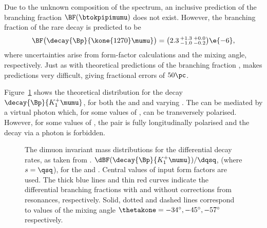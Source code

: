 Due to the unknown composition of the \mass{\kpipi} spectrum, an inclusive prediction of the
branching fraction $\BF(\btokpipimumu)$ does not exist.
However, the branching fraction of the rare decay  is predicted to
be~\cite{Hatanaka:2008gu}
\begin{equation}
  \BF\big(\decay{\Bp}{\kone{1270}\mumu}\big) = \big(2.3\,^{+1.3}_{-1.0}\,^{+0.0}_{-0.2}\big)\e{-6},
\end{equation}
where uncertainties arise from form-factor calculations and the mixing angle, respectively.
Just as with theoretical predictions of the branching fraction \btodsphi, \QCD makes predictions
very difficult, giving fractional errors of $50\pc$.


Figure~\ref{fig:th:thetak1} shows the theoretical \qsq distribution for the decay
$\decay{\Bp}{K_1^+\mumu}$, for both the  and  and varying \thetakone.
The  can be mediated by a virtual photon which, for some values of \thetakone, can
be transversely polarised.
However, for some values of \thetakone, the \mumu pair is fully longitudinally polarised and the
decay via a photon is forbidden.

\begin{figure}
  \begin{center}
    \caption[Theoretical \qsq distribution for $\decay{\Bp}{K_1^+\mumu}$]
    {
      The dimuon invariant mass distributions for the differential decay rates, as taken from
      .
      $\dBF(\decay{\Bp}{K_1^+\mumu})/\dqsq$, (where $s=\qsq$), for the  and .
      Central values of input form factors are used.
      The thick blue lines and thin red curves indicate the differential branching fractions with
      and without corrections from resonances, respectively.
      Solid, dotted and dashed lines correspond to values of the mixing angle
      $\thetakone=-34^\circ,-45^\circ,-57^\circ$ respectively.
    }
    \label{fig:th:thetak1}
  \end{center}
\end{figure}

